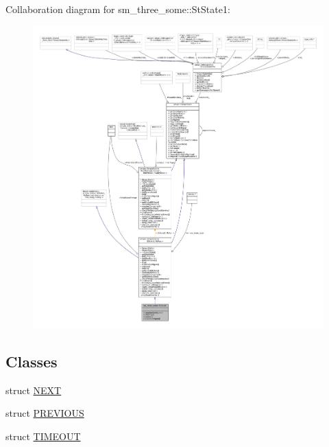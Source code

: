 Collaboration diagram for sm\+\_\+three\+\_\+some\+:\+:St\+State1\+:
\nopagebreak
\begin{figure}[H]
\begin{center}
\leavevmode
\includegraphics[width=350pt]{structsm__three__some_1_1StState1__coll__graph}
\end{center}
\end{figure}
\subsection*{Classes}
\begin{DoxyCompactItemize}
\item 
struct \hyperlink{structsm__three__some_1_1StState1_1_1NEXT}{N\+E\+XT}
\item 
struct \hyperlink{structsm__three__some_1_1StState1_1_1PREVIOUS}{P\+R\+E\+V\+I\+O\+US}
\item 
struct \hyperlink{structsm__three__some_1_1StState1_1_1TIMEOUT}{T\+I\+M\+E\+O\+UT}
\end{DoxyCompactItemize}
